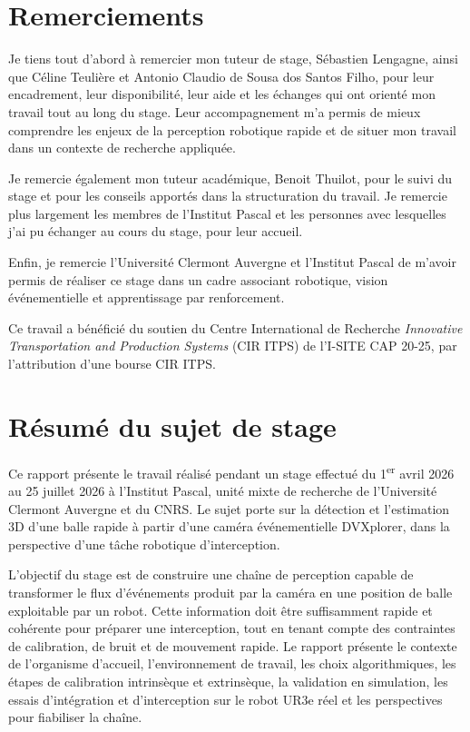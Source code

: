 \documentclass[a4paper,11pt]{report}
\begin{document}
\clearpage
{}

\chapter*{Remerciements}
{}

Je tiens tout d'abord à remercier mon tuteur de stage, Sébastien Lengagne, ainsi que Céline Teulière et Antonio Claudio de Sousa dos Santos Filho, pour leur encadrement, leur disponibilité, leur aide et les échanges qui ont orienté mon travail tout au long du stage. Leur accompagnement m'a permis de mieux comprendre les enjeux de la perception robotique rapide et de situer mon travail dans un contexte de recherche appliquée.

Je remercie également mon tuteur académique, Benoit Thuilot, pour le suivi du stage et pour les conseils apportés dans la structuration du travail. Je remercie plus largement les membres de l'Institut Pascal et les personnes avec lesquelles j'ai pu échanger au cours du stage, pour leur accueil.

Enfin, je remercie l'Université Clermont Auvergne et l'Institut Pascal de m'avoir permis de réaliser ce stage dans un cadre associant robotique, vision événementielle et apprentissage par renforcement.

Ce travail a bénéficié du soutien du Centre International de Recherche \emph{Innovative Transportation and Production Systems} (CIR ITPS) de l'I-SITE CAP 20-25, par l'attribution d'une bourse CIR ITPS.

\clearpage

\chapter*{Résumé du sujet de stage}
{}

Ce rapport présente le travail réalisé pendant un stage effectué du 1\textsuperscript{er} avril 2026 au 25 juillet 2026 à l'Institut Pascal, unité mixte de recherche de l'Université Clermont Auvergne et du CNRS. Le sujet porte sur la détection et l'estimation 3D d'une balle rapide à partir d'une caméra événementielle DVXplorer, dans la perspective d'une tâche robotique d'interception.

L'objectif du stage est de construire une chaîne de perception capable de transformer le flux d'événements produit par la caméra en une position de balle exploitable par un robot. Cette information doit être suffisamment rapide et cohérente pour préparer une interception, tout en tenant compte des contraintes de calibration, de bruit et de mouvement rapide. Le rapport présente le contexte de l'organisme d'accueil, l'environnement de travail, les choix algorithmiques, les étapes de calibration intrinsèque et extrinsèque, la validation en simulation, les essais d'intégration et d'interception sur le robot UR3e réel et les perspectives pour fiabiliser la chaîne.
\end{document}
